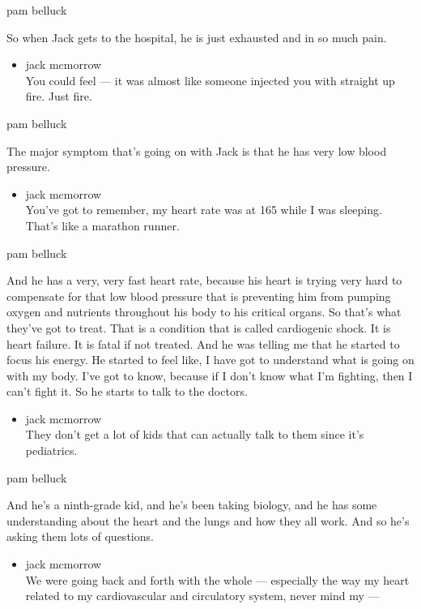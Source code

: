 pam belluck

So when Jack gets to the hospital, he is just exhausted and in so much
pain.

\begin{itemize}
\tightlist
\item
  jack mcmorrow\\
  You could feel --- it was almost like someone injected you with
  straight up fire. Just fire.
\end{itemize}

pam belluck

The major symptom that's going on with Jack is that he has very low
blood pressure.

\begin{itemize}
\tightlist
\item
  jack mcmorrow\\
  You've got to remember, my heart rate was at 165 while I was sleeping.
  That's like a marathon runner.
\end{itemize}

pam belluck

And he has a very, very fast heart rate, because his heart is trying
very hard to compensate for that low blood pressure that is preventing
him from pumping oxygen and nutrients throughout his body to his
critical organs. So that's what they've got to treat. That is a
condition that is called cardiogenic shock. It is heart failure. It is
fatal if not treated. And he was telling me that he started to focus his
energy. He started to feel like, I have got to understand what is going
on with my body. I've got to know, because if I don't know what I'm
fighting, then I can't fight it. So he starts to talk to the doctors.

\begin{itemize}
\tightlist
\item
  jack mcmorrow\\
  They don't get a lot of kids that can actually talk to them since it's
  pediatrics.
\end{itemize}

pam belluck

And he's a ninth-grade kid, and he's been taking biology, and he has
some understanding about the heart and the lungs and how they all work.
And so he's asking them lots of questions.

\begin{itemize}
\tightlist
\item
  jack mcmorrow\\
  We were going back and forth with the whole --- especially the way my
  heart related to my cardiovascular and circulatory system, never mind
  my ---
\end{itemize}

